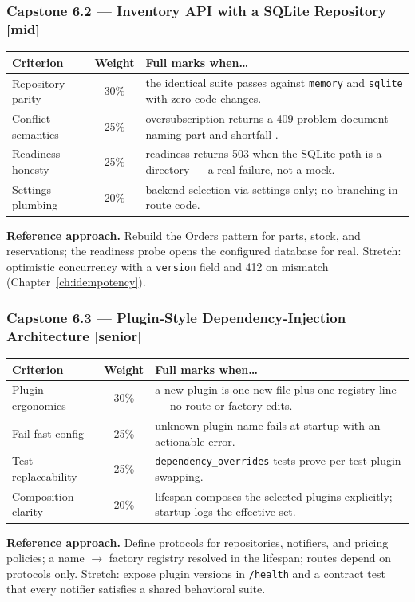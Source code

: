 \subsubsection*{Capstone 6.2 --- Inventory API with a SQLite Repository [mid]}
\begin{center}\small
\begin{tabularx}{\textwidth}{l c X}
\toprule
\textbf{Criterion} & \textbf{Weight} & \textbf{Full marks when\ldots} \\
\midrule
Repository parity & 30\% & the identical suite passes against \texttt{memory} and \texttt{sqlite} with zero code changes. \\
Conflict semantics & 25\% & oversubscription returns a 409 problem document naming part and shortfall \cite{rfc9457}. \\
Readiness honesty & 25\% & readiness returns 503 when the SQLite path is a directory --- a real failure, not a mock. \\
Settings plumbing & 20\% & backend selection via settings only; no branching in route code. \\
\bottomrule
\end{tabularx}
\end{center}
\textbf{Reference approach.} Rebuild the Orders pattern for parts, stock,
and reservations; the readiness probe opens the configured database for
real. Stretch: optimistic concurrency with a \texttt{version} field and 412
on mismatch (Chapter~\ref{ch:idempotency}).

\subsubsection*{Capstone 6.3 --- Plugin-Style Dependency-Injection Architecture [senior]}
\begin{center}\small
\begin{tabularx}{\textwidth}{l c X}
\toprule
\textbf{Criterion} & \textbf{Weight} & \textbf{Full marks when\ldots} \\
\midrule
Plugin ergonomics & 30\% & a new plugin is one new file plus one registry line --- no route or factory edits. \\
Fail-fast config & 25\% & unknown plugin name fails at startup with an actionable error. \\
Test replaceability & 25\% & \texttt{dependency\_overrides} tests prove per-test plugin swapping. \\
Composition clarity & 20\% & lifespan composes the selected plugins explicitly; startup logs the effective set. \\
\bottomrule
\end{tabularx}
\end{center}
\textbf{Reference approach.} Define protocols for repositories, notifiers,
and pricing policies; a name $\to$ factory registry resolved in the
lifespan; routes depend on protocols only. Stretch: expose plugin versions
in \texttt{/health} and a contract test that every notifier satisfies a
shared behavioral suite.

